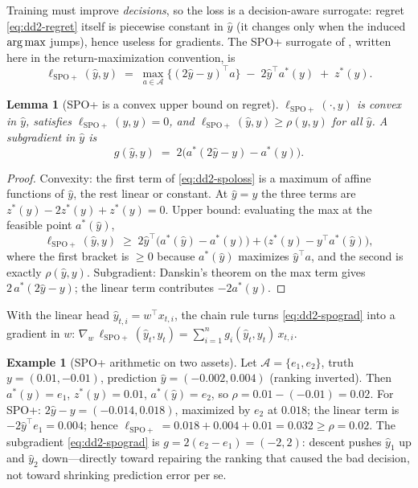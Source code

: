 \documentclass[11pt,a4paper]{article}
\theoremstyle{definition}
\newtheorem{example}{Example}[section]
\theoremstyle{plain}
\newtheorem{lemma}{Lemma}[section]
\newcommand{\argmax}{\operatornamewithlimits{arg\,max}}
\begin{document}
Training must improve \emph{decisions}, so the loss is a decision-aware
surrogate: regret \eqref{eq:dd2-regret} itself is piecewise constant in
$\hat y$ (it changes only when the induced $\argmax$ jumps), hence useless
for gradients. The SPO+ surrogate of \citet{elmachtoub2022smart}, written
here in the return-maximization convention, is
\begin{equation}
\label{eq:dd2-spoloss}
\ell_{\mathrm{SPO+}}(\hat y, y)
\;=\;
\max_{a \in \mathcal{A}} \bigl\{ (2\hat y - y)^{\top} a \bigr\}
\;-\; 2 \hat y^{\top} a^{*}(y)
\;+\; z^{*}(y).
\end{equation}

\begin{lemma}[SPO+ is a convex upper bound on regret]
\label{lem:dd2-spoplus}
$\ell_{\mathrm{SPO+}}(\cdot, y)$ is convex in $\hat y$, satisfies
$\ell_{\mathrm{SPO+}}(y, y) = 0$, and
$\ell_{\mathrm{SPO+}}(\hat y, y) \ge \rho(\hat y, y)$ for all $\hat y$.
A subgradient in $\hat y$ is
\begin{equation}
\label{eq:dd2-spograd}
g(\hat y, y) \;=\; 2\bigl(a^{*}(2\hat y - y) - a^{*}(y)\bigr).
\end{equation}
\end{lemma}

\begin{proof}
Convexity: the first term of \eqref{eq:dd2-spoloss} is a maximum of affine
functions of $\hat y$, the rest linear or constant. At $\hat y = y$ the
three terms are $z^{*}(y) - 2z^{*}(y) + z^{*}(y) = 0$. Upper bound:
evaluating the max at the feasible point $a^{*}(\hat y)$,
\[
\ell_{\mathrm{SPO+}}(\hat y, y)
\;\ge\; 2\hat y^{\top}\bigl(a^{*}(\hat y) - a^{*}(y)\bigr)
+ \bigl(z^{*}(y) - y^{\top} a^{*}(\hat y)\bigr),
\]
where the first bracket is $\ge 0$ because $a^{*}(\hat y)$ maximizes
$\hat y^{\top} a$, and the second is exactly $\rho(\hat y, y)$.
Subgradient: Danskin's theorem on the max term gives
$2\,a^{*}(2\hat y - y)$; the linear term contributes $-2a^{*}(y)$.
\end{proof}

With the linear head $\hat y_{t,i} = w^{\top} x_{t,i}$, the chain rule turns
\eqref{eq:dd2-spograd} into a gradient in $w$:
$\nabla_{w}\, \ell_{\mathrm{SPO+}}(\hat y_t, y_t)
= \sum_{i=1}^{n} g_i(\hat y_t, y_t)\, x_{t,i}$.

\begin{example}[SPO+ arithmetic on two assets]
\label{ex:dd2-spoplus}
Let $\mathcal{A} = \{e_1, e_2\}$, truth $y = (0.01, -0.01)$, prediction
$\hat y = (-0.002, 0.004)$ (ranking inverted). Then $a^{*}(y) = e_1$,
$z^{*}(y) = 0.01$, $a^{*}(\hat y) = e_2$, so
$\rho = 0.01 - (-0.01) = 0.02$. For SPO+:
$2\hat y - y = (-0.014, 0.018)$, maximized by $e_2$ at $0.018$; the linear
term is $-2\hat y^{\top} e_1 = 0.004$; hence
$\ell_{\mathrm{SPO+}} = 0.018 + 0.004 + 0.01 = 0.032 \ge \rho = 0.02$.
The subgradient \eqref{eq:dd2-spograd} is $g = 2(e_2 - e_1) = (-2, 2)$:
descent pushes $\hat y_1$ up and $\hat y_2$ down---directly toward repairing
the ranking that caused the bad decision, not toward shrinking prediction
error per se.
\end{example}
\end{document}
